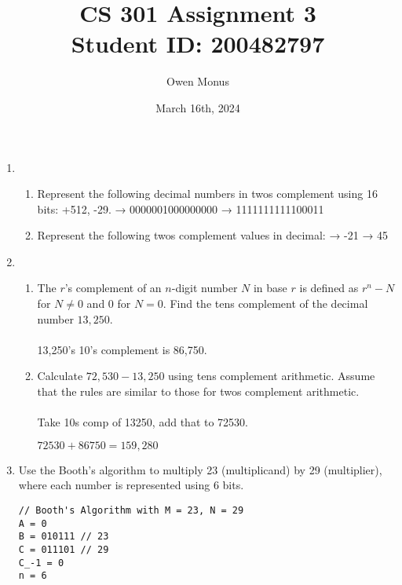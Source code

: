 \documentclass{article}
\begin{document}
\title{CS 301 Assignment 3\\[0.5cm]\large Student ID: 200482797}
\author{Owen Monus}
\date{March 16th, 2024}

\maketitle

\begin{enumerate}
    \item
    \begin{enumerate}
        \item Represent the following decimal numbers in twos complement using 16 bits: +512, -29.
         → 0000001000000000
         → 1111111111100011
        \item Represent the following twos complement values in decimal:
         → -21
         → 45
    \end{enumerate}
    
    \item
    \begin{enumerate}
        \item The $r$'s complement of an $n$-digit number $N$ in base $r$ is defined as $r^n - N$ for $N \neq 0$ and $0$ for $N = 0$. Find the tens complement of the decimal number $13,250$.
        \paragraph{} 13,250's 10's complement is 86,750.
        
        \item Calculate \(72,530 - 13,250\) using tens complement arithmetic. Assume that the rules are
        similar to those for twos complement arithmetic.
        \paragraph{} Take 10s comp of 13250, add that to 72530.

        \(72530+86750 = 159,280\)
    \end{enumerate}

    \pagebreak
    \item Use the Booth's algorithm to multiply 23 (multiplicand) by 29 (multiplier), where each
    number is represented using 6 bits.
    \begin{verbatim}
// Booth's Algorithm with M = 23, N = 29
A = 0
B = 010111 // 23
C = 011101 // 29
C_-1 = 0
n = 6


\end{verbatim}
\end{enumerate}
\end{document}

